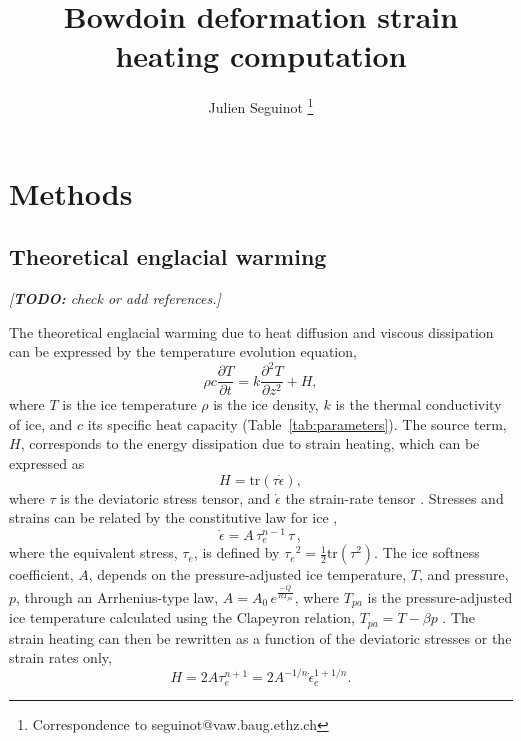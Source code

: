 \documentclass[utf8]{article}
\title{Bowdoin deformation strain heating computation}
\author[1]{Julien Seguinot
           \thanks{Correspondence to seguinot@vaw.baug.ethz.ch}}
\affil[1]{Laboratory of Hydraulics, Hydrology and Glaciology,
          ETH Zürich, Switzerland}
\newcommand{\todo}[1]{\textcolor{c3}{\emph{[\textbf{TODO:} #1]}}}
\begin{document}



\section{Methods}

\subsection{Theoretical englacial warming}

    \todo{check or add references.}

    The theoretical englacial warming due to heat diffusion and viscous
    dissipation can be expressed by the temperature evolution equation,
    \begin{equation}
      \rho c \frac{\partial T}{\partial t}
        = k \frac{\partial^2 T}{\partial z^2} + H,
    \end{equation}
    where $T$ is the ice temperature $\rho$ is the ice density, $k$ is the
    thermal conductivity of ice, and $c$ its specific heat capacity
    (Table~\ref{tab:parameters}). The source term, $H$, corresponds to the
    energy dissipation due to strain heating, which can be expressed as
    \begin{equation}
      H = \mathrm{tr}(\tau\dot\epsilon),
    \end{equation}
    where $\tau$ is the deviatoric stress tensor, and $\dot\epsilon$ the
    strain-rate tensor \citep[p.~417]{Clarke.etal.1977, Cuffey.Paterson.2010}.
    Stresses and strains can be related by the constitutive law for ice
    \citep{Glen.1952, Nye.1953},
    \begin{equation}
        \dot{\epsilon} = A\,\tau_e^{n-1}\,\tau \,,
    \end{equation}
    where the equivalent stress, $\tau_e$, is defined by ${\tau_e}^2 =
    \frac{1}{2} \mathrm{tr}(\tau^2)$. The ice softness coefficient, $A$,
    depends on the pressure-adjusted ice temperature, $T$, and pressure, $p$,
    through an Arrhenius-type law, $A = A_0 \,e^\frac{-Q}{RT_{pa}}$, where
    $T_{pa}$ is the pressure-adjusted ice temperature calculated using
    the Clapeyron relation, ${T_{pa} = T - \beta p}$
    \citep[p.~72]{Cuffey.Paterson.2010}.
    The strain heating can then be rewritten as a function of the deviatoric
    stresses or the strain rates only,
    \begin{equation}
        H = 2 A \tau_e^{n+1} = 2 A^{-1/n} \dot\epsilon_e^{1+1/n}.
    \end{equation}
\end{document}
